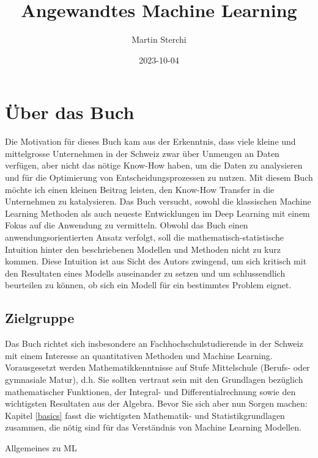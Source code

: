 \documentclass[
]{book}
\title{Angewandtes Machine Learning}
\author{Martin Sterchi}
\date{2023-10-04}
\begin{document}
\maketitle

{
\setcounter{tocdepth}{1}
\tableofcontents
}
\hypertarget{uxfcber-das-buch}{%
\chapter*{Über das Buch}\label{uxfcber-das-buch}}

Die Motivation für dieses Buch kam aus der Erkenntnis, dass viele kleine und mittelgrosse Unternehmen in der Schweiz zwar über Unmengen an Daten verfügen, aber nicht das nötige Know-How haben, um die Daten zu analysieren und für die Optimierung von Entscheidungsprozessen zu nutzen. Mit diesem Buch möchte ich einen kleinen Beitrag leisten, den Know-How Transfer in die Unternehmen zu katalysieren. Das Buch versucht, sowohl die klassischen Machine Learning Methoden als auch neueste Entwicklungen im Deep Learning mit einem Fokus auf die Anwendung zu vermitteln. Obwohl das Buch einen anwendungsorientierten Ansatz verfolgt, soll die mathematisch-statistische Intuition hinter den beschriebenen Modellen und Methoden nicht zu kurz kommen. Diese Intuition ist aus Sicht des Autors zwingend, um sich kritisch mit den Resultaten eines Modells auseinander zu setzen und um schlussendlich beurteilen zu können, ob sich ein Modell für ein bestimmtes Problem eignet.

\hypertarget{zielgruppe}{%
\section*{Zielgruppe}\label{zielgruppe}}

Das Buch richtet sich insbesondere an Fachhochschulstudierende in der Schweiz mit einem Interesse an quantitativen Methoden und Machine Learning. Vorausgesetzt werden Mathematikkenntnisse auf Stufe Mittelschule (Berufs- oder gymnasiale Matur), d.h. Sie sollten vertraut sein mit den Grundlagen bezüglich mathematischer Funktionen, der Integral- und Differentialrechnung sowie den wichtigsten Resultaten aus der Algebra. Bevor Sie sich aber nun Sorgen machen: Kapitel \ref{basics} fasst die wichtigsten Mathematik- und Statistikgrundlagen zusammen, die nötig sind für das Verständnis von Machine Learning Modellen.

Allgemeines zu ML
\end{document}
